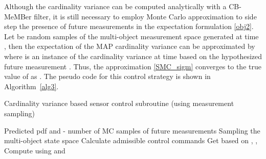 \documentclass[twocolumn]{autart}
\begin{document}
Although the cardinality variance can be computed analytically with a CB-MeMBer filter, it is still
necessary to employ Monte Carlo approximation to side step the
presence of future measurements in the expectation formulation \eqref{obj2}. Let  be random samples of the
multi-object measurement space generated at time , then the expectation
of the MAP cardinality variance can be approximated by
where  is an instance of the cardinality variance at time  based on the hypothesized future measurement . Thus, the approximation \eqref{SMC_sigm} converges to the true value of  as . The pseudo code for this
control strategy is shown in Algorithm~\ref{alg3}.
\begin{algorithm}[htb]
\caption{Cardinality variance based sensor control subroutine (using measurement sampling)}
\label{alg3}
\begin{algorithmic}[1]
    \Require Predicted pdf  and  - number of MC samples of future measurements
    \Ensure 
    \State Sampling the multi-object state space
    \Statex \quad \; 
    \State Calculate admissible control commands 
\For{}
    \State Get  based on , , 
    \For{}
    \State Compute  using  and
    \Statex \qquad\qquad\; 
    \EndFor
\State 
     \EndFor
    \State 
\end{algorithmic}
\end{algorithm}
\end{document}
